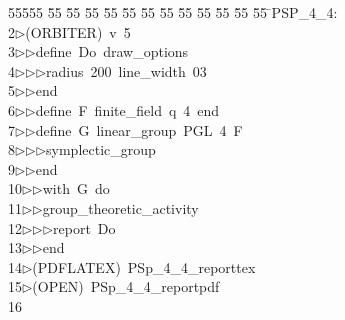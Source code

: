 %
%
\begin{tabbing}
55555 \= 55 \= 55 \= 55 \= 55 \= 55 \= 55 \= 55 \= 55 \= 55 \= 55 \= 55 \= 55 \= \>PSP\_4\_4:\\[0pt]
2\>$\triangleright$\>(ORBITER)\ v\ 5\ \\[0pt]
3\>$\triangleright$\>$\triangleright$\>define\ Do\ draw\_options\ \\[0pt]
4\>$\triangleright$\>$\triangleright$\>$\triangleright$\>radius\ 200\ line\_width\ 03\ \\[0pt]
5\>$\triangleright$\>$\triangleright$\>end\ \\[0pt]
6\>$\triangleright$\>$\triangleright$\>define\ F\ finite\_field\ q\ 4\ end\ \\[0pt]
7\>$\triangleright$\>$\triangleright$\>define\ G\ linear\_group\ PGL\ 4\ F\ \\[0pt]
8\>$\triangleright$\>$\triangleright$\>$\triangleright$\>symplectic\_group\ \\[0pt]
9\>$\triangleright$\>$\triangleright$\>end\ \\[0pt]
10\>$\triangleright$\>$\triangleright$\>with\ G\ do\ \\[0pt]
11\>$\triangleright$\>$\triangleright$\>group\_theoretic\_activity\ \\[0pt]
12\>$\triangleright$\>$\triangleright$\>$\triangleright$\>report\ Do\ \\[0pt]
13\>$\triangleright$\>$\triangleright$\>end\\[0pt]
14\>$\triangleright$\>(PDFLATEX)\ PSp\_4\_4\_reporttex\\[0pt]
15\>$\triangleright$\>(OPEN)\ PSp\_4\_4\_reportpdf\\[0pt]
16\>\end{tabbing}
